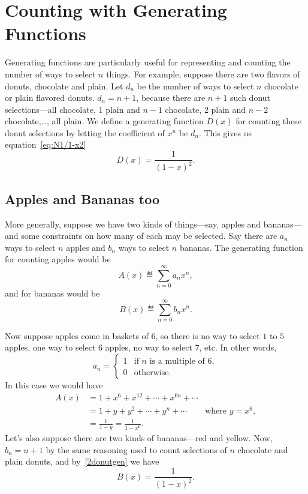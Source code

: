 \begin{problems}
\practiceproblems
{}
\end{problems}

\section{Counting with Generating Functions}\label{sec:gf_counting}
Generating functions are particularly useful for representing and
counting the number of ways to select $n$ things.  For example,
suppose there are two flavors of donuts, chocolate and plain.  Let
$d_n$ be the number of ways to select $n$ chocolate or plain flavored
donuts.  $d_n =n+1$, because there are $n+1$ such donut
selections---all chocolate, 1 plain and $n-1$ chocolate, 2 plain and
$n-2$ chocolate,\dots, all plain.  We define a generating function
$D(x)$ for counting these donut selections by letting the coefficient
of $x^n$ be $d_n$.  This gives us equation~\eqref{eq:N1/1-x2}
\begin{equation}\label{2donutgen}
D(x) = \frac{1}{(1-x)^2}.
\end{equation}

\subsection{Apples and Bananas too}
More generally, suppose we have two kinds of things---say, apples and
bananas---and some constraints on how many of each may be selected.
Say there are $a_n$ ways to select $n$ apples and $b_n$ ways to select
$n$ bananas.  The generating function for counting apples would be
\[
A(x) \eqdef \sum_{n=0}^\infty a_nx^n,
\]
and for bananas would be
\[
B(x) \eqdef \sum_{n=0}^\infty b_nx^n.
\]

Now suppose apples come in baskets of 6, so there is no way to select
$1$ to $5$ apples, one way to select 6 apples, no way to select 7,
etc.  In other words,
\[
a_n = \begin{cases}
      1 & \text{if $n$ is a multiple of 6},\\
      0 & \text{otherwise}.
\end{cases}
\]
In this case we would have
\begin{align*}
A(x)
& = 1 + x^6 + x^{12} + \cdots + x^{6n} + \cdots\\
& = 1 + y + y^2 + \cdots +y^n + \cdots
       & \text{where $y = x^6$},\\
& = \frac{1}{1 - y} = \frac{1}{1 - x^6}.
\end{align*}
Let's also suppose there are two kinds of bananas---red and yellow.
Now, $b_n = n+1$ by the same reasoning used to count selections of $n$
chocolate and plain donuts, and by~\eqref{2donutgen} we have
\[
B(x) = \frac{1}{(1-x)^2}.
\]

